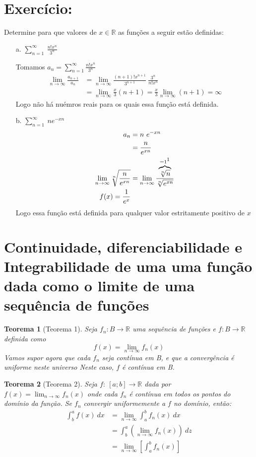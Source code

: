 \documentclass[12pt,openany, letterpaper]{book}
\newtheorem{theorem}{Teorema}[section]
\newcommand{\LI}[1][n]{\lim_{{#1} \rightarrow \infty}}
\newcommand{\soma}[2][n]{\sum_{{#1} = #2}^\infty}
\begin{document}
\section*{Exercício:} Determine para que valores de $x \in \mathds{R}$ as funções a seguir estão definidas:
\begin{itemize}
\item [a.] $\displaystyle{\soma{1} \ \frac{n! x^n}{3^n}}$

Tomamos $a_n = \soma{1} \frac{n! x^n}{3^n}$ 
\begin{align*}
\LI \frac{a_{n+1}}{a_n} &= \LI \frac{(n+1)! x^{n+1}}{3^{n+1}}\ \frac{3^n}{n! x^n} \\
&= \LI \frac{x}{3} (n+1) = \frac{x}{3} \LI (n+1) = \infty
\end{align*}
Logo não há nuémros reais para os quais essa função está definida.
\item [b.] $\displaystyle{\soma{1} \ ne^{-xn}}$
\begin{align*}
a_n &= n \ e^{-xn} \\
&= \frac{n}{e^{xn}} \\
\LI \sqrt[n]{\frac{n}{e^{xn}}} &= \LI \frac{\overbrace{\sqrt[n]{n}}^{=1 \footnote{\ref{subsec:ex223}}}}{\sqrt[n]{e^{xn}}} \\
f(x) = \frac{1}{e^x}
\end{align*}
Logo essa função está definida para qualquer valor estritamente positivo de $x$
\end{itemize}

\section{Continuidade, diferenciabilidade e Integrabilidade de uma uma função dada como o limite de uma sequência de funções}

\begin{theorem}[Teorema 1\label{t:3-1}] 
Seja $f_n: B \rightarrow \mathds{R}$ uma sequência de funções e $f: B \rightarrow \mathds{R}$ definida como  $$f(x) = \LI f_n(x)$$ \hspace{5mm}Vamos supor agora que cada $f_n$ seja contínua em B, e que a convergência é uniforme neste universo  Neste caso, $f$ é contínua em B.
\end{theorem}

\begin{theorem}[Teorema 2\label{t:3-2}] 
Seja $f: \ [a;b] \rightarrow \mathds{R}$ dada por $f(x) = \LI f_n (x)$ onde cada $f_n$ é contínua em todos os pontos do domínio da função. Se $f_n$ convergir uniformemente a $f$ no domínio, então: \begin{align*}
\int_b^a f(x) \ dx &= \LI \int_a^b f_n(x) \ dx \\
&= \int_b^a \left( \LI f_n(x) \right) \ dz  \\ 
&= \LI \left[\int_a^b f_n (x) \right] \\
\end{align*}
\end{theorem}
\end{document}
